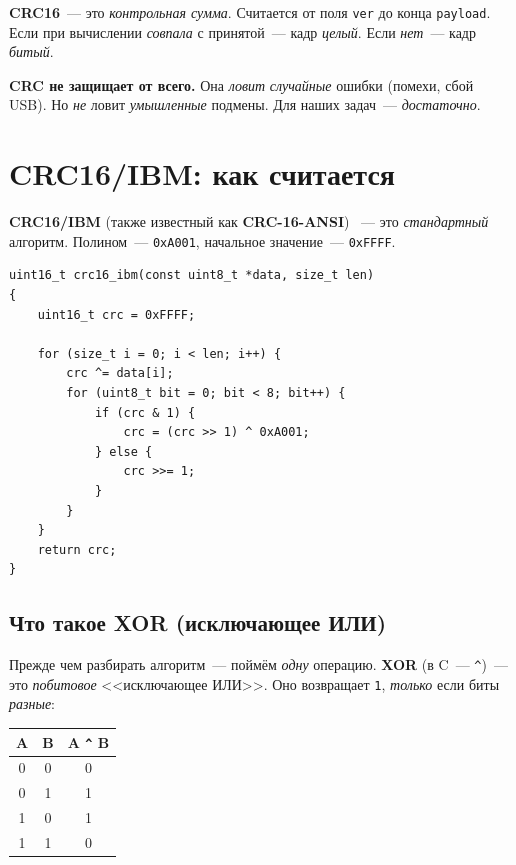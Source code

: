 \textbf{CRC16}~--- это \emph{контрольная сумма}. Считается
от поля \texttt{ver} до конца \texttt{payload}. Если
при вычислении \emph{совпала} с принятой~--- кадр \emph{целый}.
Если \emph{нет}~--- кадр \emph{битый}.

\begin{warnbox}
\textbf{CRC не защищает от всего.} Она \emph{ловит}
\emph{случайные} ошибки (помехи, сбой USB). Но
\emph{не} ловит \emph{умышленные} подмены. Для
наших задач~--- \emph{достаточно}.
\end{warnbox}

\section{CRC16/IBM: как считается}
\label{sec:protocol-crc16}

\textbf{CRC16/IBM} (также известный как \textbf{CRC-16-ANSI})
~--- это \emph{стандартный} алгоритм. Полином~---
\texttt{0xA001}, начальное значение~--- \texttt{0xFFFF}.

\begin{listing}[htbp]
\begin{verbatim}
uint16_t crc16_ibm(const uint8_t *data, size_t len)
{
    uint16_t crc = 0xFFFF;

    for (size_t i = 0; i < len; i++) {
        crc ^= data[i];
        for (uint8_t bit = 0; bit < 8; bit++) {
            if (crc & 1) {
                crc = (crc >> 1) ^ 0xA001;
            } else {
                crc >>= 1;
            }
        }
    }
    return crc;
}
\end{verbatim}
\caption{\texttt{crc16\_ibm()}~--- подсчёт CRC16}
\label{lst:protocol-crc16}
\end{listing}

\subsection{Что такое XOR (исключающее ИЛИ)}

Прежде чем разбирать алгоритм~--- поймём \emph{одну}
операцию. \textbf{XOR} (в C~--- \texttt{\^{}})~--- это
\emph{побитовое} <<исключающее ИЛИ>>. Оно возвращает
\texttt{1}, \emph{только} если биты \emph{разные}:

\begin{center}
\begin{tabular}{cc|c}
\textbf{A} & \textbf{B} & \textbf{A \texttt{\^{}} B} \\
\hline
0 & 0 & 0 \\
0 & 1 & 1 \\
1 & 0 & 1 \\
1 & 1 & 0 \\
\end{tabular}
\end{center}

